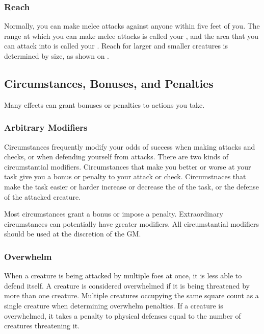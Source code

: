         \subsubsection{Reach}\label{Reach}
            Normally, you can make melee attacks against anyone within five feet of you.
            The range at which you can make melee attacks is called your , and the area that you can attack into is called your .
            Reach for larger and smaller creatures is determined by size, as shown on .

    \subsection{Circumstances, Bonuses, and Penalties}

        Many effects can grant bonuses or penalties to actions you take.

        \subsubsection{Arbitrary Modifiers}

            Circumstances frequently modify your odds of success when making attacks and checks, or when defending yourself from attacks.
            There are two kinds of circumstantial modifiers.
            Circumstances that make you better or worse at your task give you a bonus or penalty to your attack or check.
            Circumstnaces that make the task easier or harder increase or decrease the  of the task, or the defense of the attacked creature.

            Most circumstances grant a  bonus or impose a  penalty.
            Extraordinary circumstances can potentially have greater modifiers.
            All circumstantial modifiers should be used at the discretion of the GM.\@

        \subsubsection{Overwhelm}\label{Overwhelm}
            When a creature is being attacked by multiple foes at once, it is less able to defend itself.
            A creature is considered overwhelmed if it is being threatened by more than one creature.
            Multiple creatures occupying the same square count as a single creature when determining overwhelm penalties.
            If a creature is overwhelmed, it takes a penalty to physical defenses equal to the number of creatures threatening it.

